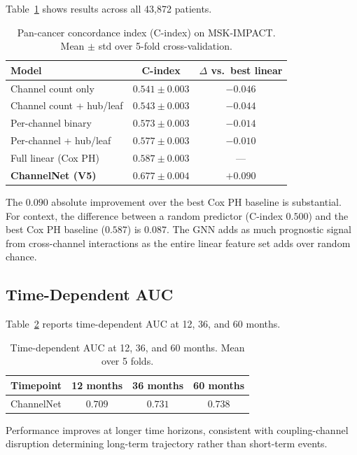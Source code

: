 \documentclass[11pt]{article}
\begin{document}
Table~\ref{tab:main-results} shows results across all 43{,}872
patients.

\begin{table}[ht]
\centering
\caption{Pan-cancer concordance index (C-index) on MSK-IMPACT.
Mean $\pm$ std over 5-fold cross-validation.}
\label{tab:main-results}
\begin{tabular}{@{}lcc@{}}
\toprule
Model & C-index & $\Delta$ vs.\ best linear \\
\midrule
Channel count only & $0.541 \pm 0.003$ & $-0.046$ \\
Channel count + hub/leaf & $0.543 \pm 0.003$ & $-0.044$ \\
Per-channel binary & $0.573 \pm 0.003$ & $-0.014$ \\
Per-channel + hub/leaf & $0.577 \pm 0.003$ & $-0.010$ \\
Full linear (Cox PH) & $0.587 \pm 0.003$ & --- \\
\midrule
\textbf{ChannelNet (V5)} & $\mathbf{0.677 \pm 0.004}$
   & $\mathbf{+0.090}$ \\
\bottomrule
\end{tabular}
\end{table}

The $0.090$ absolute improvement over the best Cox PH baseline
is substantial. For context, the difference between a random
predictor (C-index $0.500$) and the best Cox PH baseline
($0.587$) is $0.087$. The GNN adds as much prognostic signal
from cross-channel interactions as the entire linear feature set
adds over random chance.

\subsection{Time-Dependent AUC}

Table~\ref{tab:td-auc} reports time-dependent AUC at 12, 36,
and 60 months.

\begin{table}[ht]
\centering
\caption{Time-dependent AUC at 12, 36, and 60 months. Mean
over 5 folds.}
\label{tab:td-auc}
\begin{tabular}{@{}lccc@{}}
\toprule
Timepoint & 12 months & 36 months & 60 months \\
\midrule
ChannelNet & $0.709$ & $0.731$ & $0.738$ \\
\bottomrule
\end{tabular}
\end{table}

Performance improves at longer time horizons, consistent with
coupling-channel disruption determining long-term trajectory
rather than short-term events.
\end{document}
